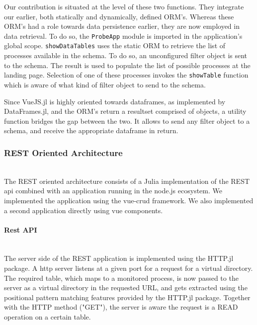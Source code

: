 \documentclass{juliacon}
\begin{document}
Our contribution is situated at the level of these two functions. They integrate our earlier, both statically and dynamically, defined ORM's. Whereas these ORM's had a role towards data persistence earlier, they are  now employed in data retrieval. To do so, the \texttt{ProbeApp} module is imported in the application's global scope. \texttt{showDataTables} uses the static ORM to retrieve the list of processes available in the schema. To do so, an unconfigured filter object is sent to the schema. The result is used to populate the list of possible processes at the landing page. Selection of one of these processes invokes the \texttt{showTable} function which is aware of what kind of filter object to send to the schema.\vskip 6pt

Since VueJS.jl is highly oriented towards dataframes, as implemented by DataFrames.jl, and the ORM's return a resultset comprised of objects, a utility function bridges the gap between the two. It allows to send any filter object to a schema, and receive the appropriate dataframe in return.\vskip 6pt

\subsubsection{REST Oriented Architecture}\hfill\\

The REST oriented architecture consists of a Julia implementation of the REST api combined with an application running in the node.js ecosystem. We implemented the application using the vue-crud \cite{masny2018vuecrud} framework. We also implemented a second application directly using vue components.\vskip 6pt

\paragraph{Rest API}\hfill\\

The server side of the REST application is implemented using the HTTP.jl package. A http server listens at a given port for a request for a virtual directory. The required table, which maps to a monitored process, is now passed to the server as a virtual directory in the requested URL, and gets extracted using the positional pattern matching features provided by the HTTP.jl package. Together with the HTTP method ("GET"), the server is aware the request is a READ operation on a certain table.\vskip 6pt
\end{document}
